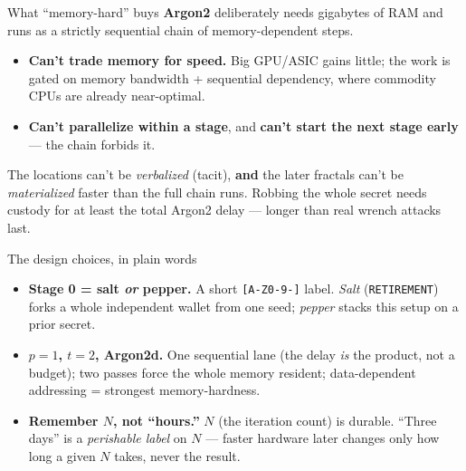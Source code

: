 \documentclass[aspectratio=169,11pt]{beamer}
\begin{document}
\begin{frame}{What ``memory-hard'' buys}
  \textbf{Argon2} deliberately needs gigabytes of RAM and runs as a strictly
  sequential chain of memory-dependent steps.
  \begin{itemize}\small
    \item \textbf{Can't trade memory for speed.} Big GPU/ASIC gains little; the
      work is gated on memory bandwidth + sequential dependency, where commodity
      CPUs are already near-optimal.
    \item \textbf{Can't parallelize within a stage}, and \textbf{can't start the
      next stage early} --- the chain forbids it.
  \end{itemize}
  \begin{keyidea}
    The locations can't be \emph{verbalized} (tacit), \textbf{and} the later
    fractals can't be \emph{materialized} faster than the full chain runs.
    Robbing the whole secret needs custody for at least the total Argon2 delay ---
    longer than real wrench attacks last.
  \end{keyidea}
\end{frame}

\begin{frame}{The design choices, in plain words}
  \small
  \begin{itemize}
    \item \textbf{Stage 0 = salt \emph{or} pepper.} A short \texttt{[A-Z0-9-]}
      label. \emph{Salt} (\texttt{RETIREMENT}) forks a whole independent wallet
      from one seed; \emph{pepper} stacks this setup on a prior secret.
    \item \textbf{$p=1$, $t=2$, Argon2d.} One sequential lane (the delay
      \emph{is} the product, not a budget); two passes force the whole memory
      resident; data-dependent addressing = strongest memory-hardness.
    \item \textbf{Remember $N$, not ``hours.''} $N$ (the iteration count) is
      durable. ``Three days'' is a \emph{perishable label} on $N$ --- faster
      hardware later changes only how long a given $N$ takes, never the result.
  \end{itemize}
\end{frame}
\end{document}
